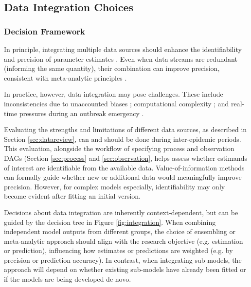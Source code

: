 \documentclass{article}
\begin{document}
\subsection{Data Integration Choices}

\subsubsection{Decision Framework}

In principle, integrating multiple data sources should enhance the identifiability and precision of parameter estimates \citep{deangelis2018analysing, lison2024generative, russell2024combined, birrell2025real}. Even when data streams are redundant (informing the same quantity), their combination can improve precision, consistent with meta-analytic principles \citep{deangelis2018analysing,borenstein2021introduction}. 

In practice, however, data integration may pose challenges. These include inconsistencies due to unaccounted biases \citep{presanis2013conflict,knock2021key, Ward2024-sp, corbella2022inferring}; computational complexity \citep{corbella2022inferring}; and real-time pressures during an outbreak emergency \citep{mccaw2023role}.

Evaluating the strengths and limitations of different data sources, as described in Section \ref{sec:datareview}, can and should be done during inter-epidemic periods. This evaluation, alongside the workflow of specifying process and observation DAGs (Section \ref{sec:process} and \ref{sec:observation}, helps assess whether estimands of interest are identifiable from the available data. Value-of-information methods \citep{jackson2019value,heath2024value} can formally guide whether new or additional data would meaningfully improve precision. However, for complex models especially, identifiability may only become evident after fitting an initial version.

Decisions about data integration are inherently context-dependent, but can be guided by the decision tree in Figure \ref{fig:integration}. When combining independent model outputs from different groups, the choice of ensembling or meta-analytic approach should align with the research objective (e.g. estimation or prediction), influencing how estimates or predictions are weighted (e.g. by precision or prediction accuracy). In contrast, when integrating sub-models, the approach will depend on whether existing sub-models have already been fitted or if the models are being developed de novo.
\end{document}
